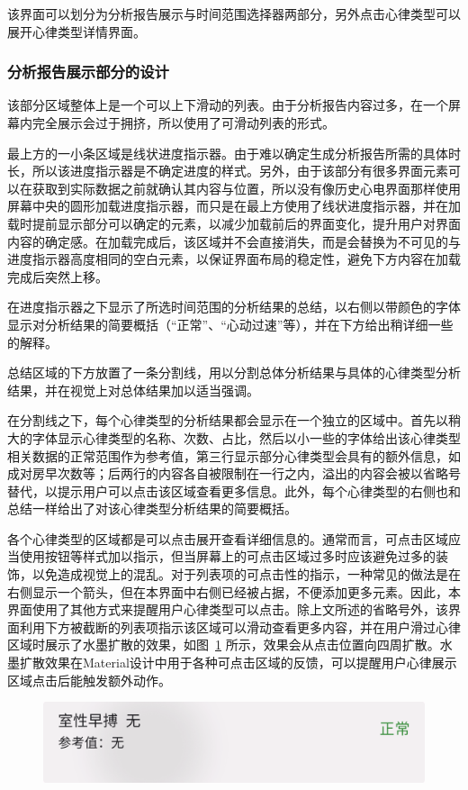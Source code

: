 该界面可以划分为分析报告展示与时间范围选择器两部分，另外点击心律类型可以展开心律类型详情界面。

\subsubsection{分析报告展示部分的设计}\label{subsubsec:analytics-display-design}

该部分区域整体上是一个可以上下滑动的列表。由于分析报告内容过多，在一个屏幕内完全展示会过于拥挤，所以使用了可滑动列表的形式。

最上方的一小条区域是线状进度指示器。由于难以确定生成分析报告所需的具体时长，所以该进度指示器是不确定进度的样式。另外，由于该部分有很多界面元素可以在获取到实际数据之前就确认其内容与位置，所以没有像历史心电界面那样使用屏幕中央的圆形加载进度指示器，而只是在最上方使用了线状进度指示器，并在加载时提前显示部分可以确定的元素，以减少加载前后的界面变化，提升用户对界面内容的确定感。在加载完成后，该区域并不会直接消失，而是会替换为不可见的与进度指示器高度相同的空白元素，以保证界面布局的稳定性，避免下方内容在加载完成后突然上移。

在进度指示器之下显示了所选时间范围的分析结果的总结，以右侧以带颜色的字体显示对分析结果的简要概括（“正常”、“心动过速”等），并在下方给出稍详细一些的解释。

总结区域的下方放置了一条分割线，用以分割总体分析结果与具体的心律类型分析结果，并在视觉上对总体结果加以适当强调。

在分割线之下，每个心律类型的分析结果都会显示在一个独立的区域中。首先以稍大的字体显示心律类型的名称、次数、占比，然后以小一些的字体给出该心律类型相关数据的正常范围作为参考值，第三行显示部分心律类型会具有的额外信息，如成对房早次数等；后两行的内容各自被限制在一行之内，溢出的内容会被以省略号替代，以提示用户可以点击该区域查看更多信息。此外，每个心律类型的右侧也和总结一样给出了对该心律类型分析结果的简要概括。

各个心律类型的区域都是可以点击展开查看详细信息的。通常而言，可点击区域应当使用按钮等样式加以指示，但当屏幕上的可点击区域过多时应该避免过多的装饰，以免造成视觉上的混乱。对于列表项的可点击性的指示，一种常见的做法是在右侧显示一个箭头，但在本界面中右侧已经被占据，不便添加更多元素。因此，本界面使用了其他方式来提醒用户心律类型可以点击。除上文所述的省略号外，该界面利用下方被截断的列表项指示该区域可以滑动查看更多内容，并在用户滑过心律区域时展示了水墨扩散的效果，如图~\ref{fig:ink} 所示，效果会从点击位置向四周扩散。水墨扩散效果在Material设计中用于各种可点击区域的反馈，可以提醒用户心律展示区域点击后能触发额外动作。

\begin{figure}[ht]
    \centering
    \includegraphics[width=.5\textwidth]{../assets/ink}
    \label{fig:ink}
\end{figure}

